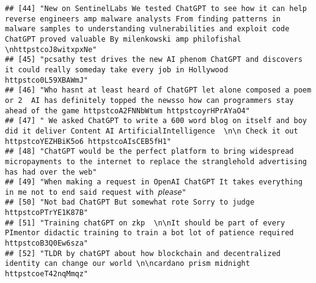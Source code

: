 \documentclass[
]{article}
\begin{document}
\begin{verbatim}
## [44] "New on SentinelLabs We tested ChatGPT to see how it can help reverse engineers amp malware analysts From finding patterns in malware samples to understanding vulnerabilities and exploit code ChatGPT proved valuable By milenkowski amp philofishal \nhttpstcoJ8witxpxNe"                                        
## [45] "pcsathy test drives the new AI phenom ChatGPT and discovers it could really someday take every job in Hollywood httpstco0L59XBAWmJ"                                                                                                                                                                                
## [46] "Who hasnt at least heard of ChatGPT let alone composed a poem or 2  AI has definitely topped the newsso how can programmers stay ahead of the game httpstcoA2FNNbWtum httpstcoyrHPrAYaO4"                                                                                                                          
## [47] " We asked ChatGPT to write a 600 word blog on itself and boy did it deliver Content AI ArtificialIntelligence  \n\n Check it out httpstcoYEZHBiK5o6 httpstcoAIsCEB5fH1"                                                                                                                                            
## [48] "ChatGPT would be the perfect platform to bring widespread micropayments to the internet to replace the stranglehold advertising has had over the web"                                                                                                                                                              
## [49] "When making a request in OpenAI ChatGPT It takes everything in me not to end said request with 𝘱𝘭𝘦𝘢𝘴𝘦"                                                                                                                                                                                                             
## [50] "Not bad ChatGPT But somewhat rote Sorry to judge httpstcoPTrYE1K87B"                                                                                                                                                                                                                                               
## [51] "Training chatGPT on zkp  \n\nIt should be part of every PImentor didactic training to train a bot lot of patience required httpstcoB3Q0Ew6sza"                                                                                                                                                                     
## [52] "TLDR by chatGPT about how blockchain and decentralized identity can change our world \n\ncardano prism midnight httpstcoeT42nqMmqz"                                                                                                                                                                                

\end{verbatim}
\end{document}
